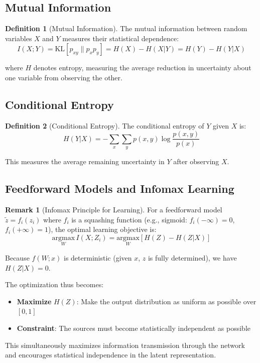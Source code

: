 \documentclass[12pt,a4paper]{article}
\theoremstyle{definition}
\newtheorem{definition}{Definition}[section]
\newtheorem{remark}{Remark}[section]
\begin{document}
\subsection{Mutual Information}

\begin{definition}[Mutual Information]
The mutual information between random variables $X$ and $Y$ measures their statistical dependence:
\[
I(X; Y) = \text{KL}[p_{xy} \| p_x p_y] = H(X) - H(X|Y) = H(Y) - H(Y|X)
\]

where $H$ denotes entropy, measuring the average reduction in uncertainty about one variable from observing the other.
\end{definition}

\subsection{Conditional Entropy}

\begin{definition}[Conditional Entropy]
The conditional entropy of $Y$ given $X$ is:
\[
H(Y|X) = -\sum_x \sum_y p(x,y) \log \frac{p(x,y)}{p(x)}
\]

This measures the average remaining uncertainty in $Y$ after observing $X$.
\end{definition}

\subsection{Feedforward Models and Infomax Learning}

\begin{remark}[Infomax Principle for Learning]
For a feedforward model $\tilde{z} = f_i(z_i)$ where $f_i$ is a squashing function (e.g., sigmoid: $f_i(-\infty) = 0$, $f_i(+\infty) = 1$), the optimal learning objective is:
\[
\underset{W}{\text{argmax}} \, I(X; Z_i) = \underset{W}{\text{argmax}} \left[H(Z) - H(Z|X)\right]
\]

Because $f(W; x)$ is deterministic (given $x$, $z$ is fully determined), we have $H(Z|X) = 0$.

The optimization thus becomes:
\begin{itemize}
    \item \textbf{Maximize} $H(Z)$: Make the output distribution as uniform as possible over $[0, 1]$
    \item \textbf{Constraint}: The sources must become statistically independent as possible
\end{itemize}

This simultaneously maximizes information transmission through the network and encourages statistical independence in the latent representation.
\end{remark}
\end{document}
